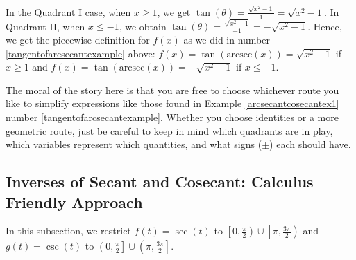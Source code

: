\smallskip

In the Quadrant I case, when $x \geq 1$, we get $\tan(\theta)  = \frac{\sqrt{x^2-1}}{1} = \sqrt{x^2-1}$.  In Quadrant II, when $x \leq -1$, we obtain  $\tan(\theta)  = \frac{\sqrt{x^2-1}}{-1} = - \sqrt{x^2-1}$.   Hence, we get the piecewise definition for $f(x)$ as we did in number \ref{tangentofarcsecantexample} above:  $f(x)  = \tan(\mbox{arcsec}(x)) = \sqrt{x^2-1}$ if $x \geq 1$ and $f(x)  = \tan(\mbox{arcsec}(x)) = -\sqrt{x^2-1}$ if $x \leq -1$.

\smallskip

The moral of the story here is that you are free to choose whichever route you like to simplify expressions like those found in Example \ref{arcsecantcosecantex1} number \ref{tangentofarcsecantexample}.  Whether you choose identities or a more geometric route, just be careful to keep in mind which quadrants are in play, which variables represent which quantities, and what signs ($\pm$) each should have.


\subsection{Inverses of Secant and Cosecant: Calculus Friendly Approach}
\label{arcsecantcalcfriendly}

In this subsection, we restrict $f(t) = \sec(t)$ to $\left[0, \frac{\pi}{2}\right) \cup \left[\pi, \frac{3\pi}{2}\right)$  and  $g(t) = \csc(t)$ to $\left(0, \frac{\pi}{2}\right] \cup \left( \pi, \frac{3\pi}{2}\right]$.  

